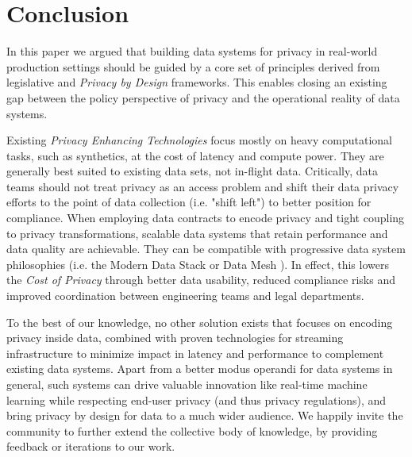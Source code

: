 \documentclass[11pt]{article} %
\begin{document}
\section{Conclusion}
In this paper we argued that building data systems for privacy in real-world production settings should be guided by a core set of principles derived from legislative and \textit{Privacy by Design} frameworks. This enables closing an existing gap between the policy perspective of privacy and the operational reality of data systems.

Existing \textit{Privacy Enhancing Technologies} focus mostly on heavy computational tasks, such as synthetics, at the cost of latency and compute power. They are generally best suited to existing data sets, not in-flight data. Critically, data teams should not treat privacy as an access problem and shift their data privacy efforts to the point of data collection (i.e. "shift left") to better position for compliance. When employing data contracts to encode privacy and tight coupling to privacy transformations, scalable data systems that retain performance and data quality are achievable. They can be compatible with progressive data system philosophies (i.e. the Modern Data Stack or Data Mesh \cite{machado2022data}). In effect, this lowers the \textit{Cost of Privacy} through better data usability, reduced compliance risks and improved coordination between engineering teams and legal departments.

To the best of our knowledge, no other solution exists that focuses on encoding privacy inside data, combined with proven technologies for streaming infrastructure to minimize impact in latency and performance to complement existing data systems. Apart from a better modus operandi for data systems in general, such systems can drive valuable innovation like real-time machine learning while respecting end-user privacy (and thus privacy regulations), and bring privacy by design for data to a much wider audience. We happily invite the community to further extend the collective body of knowledge, by providing feedback or iterations to our work.

% 
% 
\end{document}
